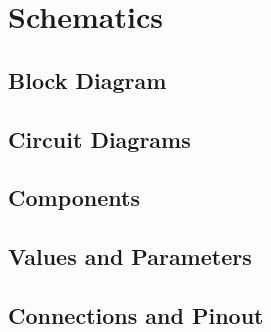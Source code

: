 



\section{Schematics}\label{02Sec:Schematics}




\subsection{Block Diagram}\label{02Sub:BlockDiagram}


\subsection{Circuit Diagrams}\label{02Sub:CircuitDiagrams}



\subsection{Components}\label{02Sub:Components}



\subsection{Values and Parameters}\label{02Sub:ValuesAndParameters}




\subsection{Connections and Pinout}\label{02Sub:ConnectionsAndPinout}









